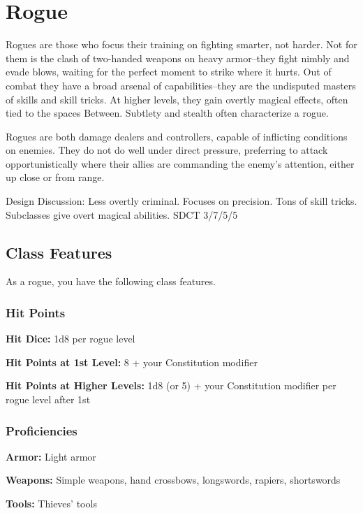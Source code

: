 \section{Rogue}\label{class:rogue}

Rogues are those who focus their training on fighting smarter, not harder. Not for them is the clash of two-handed weapons on heavy armor--they fight nimbly and evade blows, waiting for the perfect moment to strike where it hurts. Out of combat they have a broad arsenal of capabilities--they are the undisputed masters of skills and skill tricks. At higher levels, they gain overtly magical effects, often tied to the spaces Between. Subtlety and stealth often characterize a rogue.

Rogues are both damage dealers and controllers, capable of inflicting conditions on enemies. They do not do well under direct pressure, preferring to attack opportunistically where their allies are commanding the enemy's attention, either up close or from range.

Design Discussion: Less overtly criminal. Focuses on precision. Tons of skill tricks. Subclasses give overt magical abilities. SDCT 3/7/5/5

\subsection{Class Features}

As a rogue, you have the following class features.

\subsubsection{Hit Points}

\textbf{Hit Dice:} 1d8 per rogue level

\textbf{Hit Points at 1st Level:} 8 + your Constitution modifier

\textbf{Hit Points at Higher Levels:} 1d8 (or 5) + your Constitution modifier per rogue level after 1st

\subsubsection{Proficiencies}

\textbf{Armor:} Light armor

\textbf{Weapons:} Simple weapons, hand crossbows, longswords, rapiers, shortswords

\textbf{Tools:} Thieves' tools

